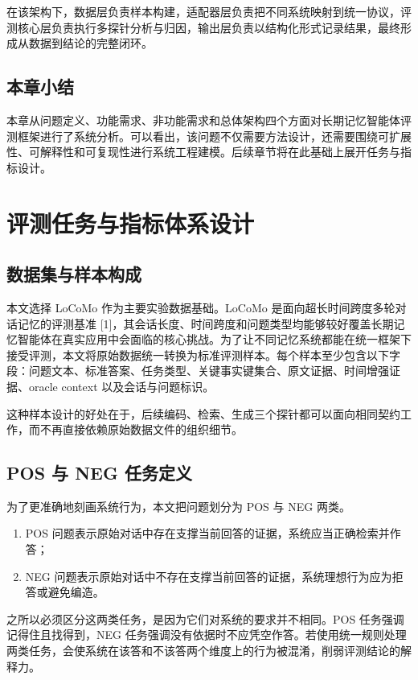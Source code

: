 在该架构下，数据层负责样本构建，适配器层负责把不同系统映射到统一协议，评测核心层负责执行多探针分析与归因，输出层负责以结构化形式记录结果，最终形成从数据到结论的完整闭环。

\section{本章小结}

本章从问题定义、功能需求、非功能需求和总体架构四个方面对长期记忆智能体评测框架进行了系统分析。可以看出，该问题不仅需要方法设计，还需要围绕可扩展性、可解释性和可复现性进行系统工程建模。后续章节将在此基础上展开任务与指标设计。

\chapter{评测任务与指标体系设计}

\section{数据集与样本构成}

本文选择 LoCoMo 作为主要实验数据基础。LoCoMo 是面向超长时间跨度多轮对话记忆的评测基准 [1]，其会话长度、时间跨度和问题类型均能够较好覆盖长期记忆智能体在真实应用中会面临的核心挑战。为了让不同记忆系统都能在统一框架下接受评测，本文将原始数据统一转换为标准评测样本。每个样本至少包含以下字段：问题文本、标准答案、任务类型、关键事实键集合、原文证据、时间增强证据、oracle context 以及会话与问题标识。

这种样本设计的好处在于，后续编码、检索、生成三个探针都可以面向相同契约工作，而不再直接依赖原始数据文件的组织细节。

\section{POS 与 NEG 任务定义}

为了更准确地刻画系统行为，本文把问题划分为 POS 与 NEG 两类。

\begin{enumerate}
    \item POS 问题表示原始对话中存在支撑当前回答的证据，系统应当正确检索并作答；
    \item NEG 问题表示原始对话中不存在支撑当前回答的证据，系统理想行为应为拒答或避免编造。
\end{enumerate}

之所以必须区分这两类任务，是因为它们对系统的要求并不相同。POS 任务强调记得住且找得到，NEG 任务强调没有依据时不应凭空作答。若使用统一规则处理两类任务，会使系统在该答和不该答两个维度上的行为被混淆，削弱评测结论的解释力。

